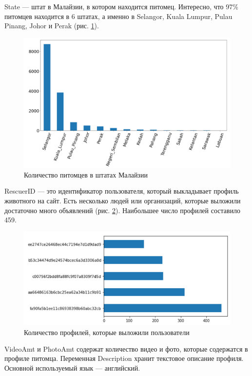 \documentclass[14pt]{mmcs_article}
\begin{document}
State --- штат в Малайзии, в котором находится питомец. Интересно, что 97\% питомцев находится в 6 штатах, а именно в Selangor, Kuala Lumpur, Pulau Pinang, Johor и Perak (рис. \ref{analyse:state}).

\begin{figure}[H]
	\centering
	\includegraphics[scale=0.5]{state.png}
	\caption{Количество питомцев в штатах Малайзии}\label{analyse:state}
\end{figure}

RescuerID --- это идентификатор пользователя, который выкладывает профиль животного на сайт. Есть несколько людей или организаций, которые выложили достаточно много объявлений (рис. \ref{analyse:rescuer}). Наибольшее число профилей составило 459.

\begin{figure}[H]
	\centering
	\includegraphics[scale=0.8]{rescuer.png}
	\caption{Количество профилей, которые выложили пользователи}\label{analyse:rescuer}
\end{figure}

VideoAmt и PhotoAmt содержат количество видео и фото, которые содержатся в профиле питомца.
Переменная Description хранит текстовое описание профиля. Основной используемый язык --- английский.
\end{document}
